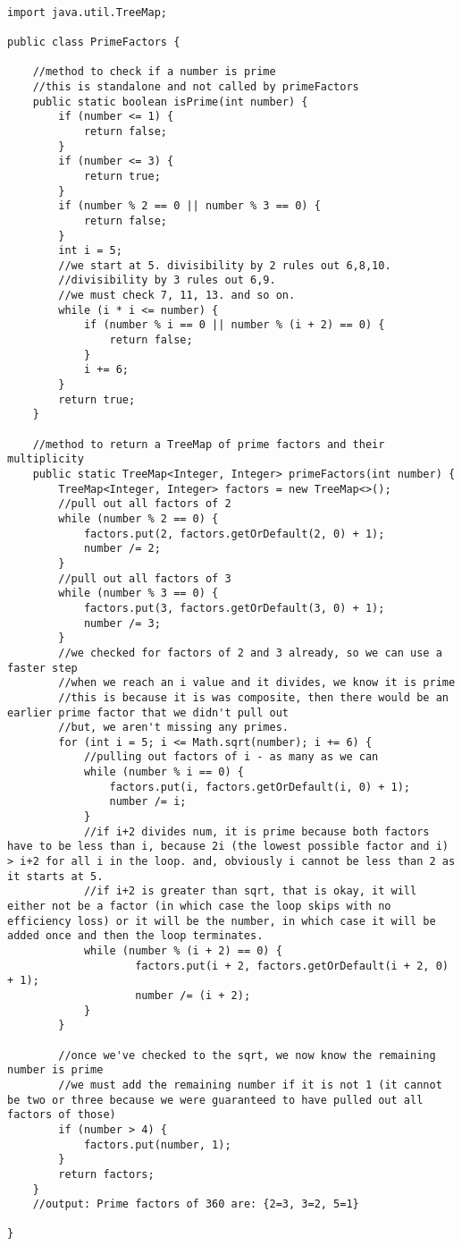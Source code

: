 \documentclass{article}
\begin{document}
\begin{lstlisting}

import java.util.TreeMap;

public class PrimeFactors {

    //method to check if a number is prime
    //this is standalone and not called by primeFactors
    public static boolean isPrime(int number) {
        if (number <= 1) {
            return false;
        }
        if (number <= 3) {
            return true;
        }
        if (number % 2 == 0 || number % 3 == 0) {
            return false;
        }
        int i = 5;
        //we start at 5. divisibility by 2 rules out 6,8,10. 
        //divisibility by 3 rules out 6,9. 
        //we must check 7, 11, 13. and so on.
        while (i * i <= number) {
            if (number % i == 0 || number % (i + 2) == 0) {
                return false;
            }
            i += 6;
        }
        return true;
    }

    //method to return a TreeMap of prime factors and their multiplicity
    public static TreeMap<Integer, Integer> primeFactors(int number) {
        TreeMap<Integer, Integer> factors = new TreeMap<>();
        //pull out all factors of 2
        while (number % 2 == 0) {
            factors.put(2, factors.getOrDefault(2, 0) + 1);
            number /= 2;
        }
        //pull out all factors of 3
        while (number % 3 == 0) {
            factors.put(3, factors.getOrDefault(3, 0) + 1);
            number /= 3;
        }
        //we checked for factors of 2 and 3 already, so we can use a faster step
        //when we reach an i value and it divides, we know it is prime
        //this is because it is was composite, then there would be an earlier prime factor that we didn't pull out
        //but, we aren't missing any primes.
        for (int i = 5; i <= Math.sqrt(number); i += 6) {
            //pulling out factors of i - as many as we can
            while (number % i == 0) {
                factors.put(i, factors.getOrDefault(i, 0) + 1);
                number /= i;
            }
            //if i+2 divides num, it is prime because both factors have to be less than i, because 2i (the lowest possible factor and i) > i+2 for all i in the loop. and, obviously i cannot be less than 2 as it starts at 5.
            //if i+2 is greater than sqrt, that is okay, it will either not be a factor (in which case the loop skips with no efficiency loss) or it will be the number, in which case it will be added once and then the loop terminates.
            while (number % (i + 2) == 0) {
                    factors.put(i + 2, factors.getOrDefault(i + 2, 0) + 1);
                    number /= (i + 2);
            }
        }

        //once we've checked to the sqrt, we now know the remaining number is prime
        //we must add the remaining number if it is not 1 (it cannot be two or three because we were guaranteed to have pulled out all factors of those)
        if (number > 4) {
            factors.put(number, 1);
        }
        return factors;
    }
    //output: Prime factors of 360 are: {2=3, 3=2, 5=1}
    
}

\end{lstlisting}
\end{document}
